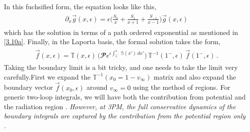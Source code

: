 In this fuchsified form, the equation looks like this,
\begin{align}
    \begin{split}
        \partial_x\vec g(x,\epsilon)=\epsilon \Bigg(\frac{S_0}{x}+\frac{S_1}{x+1}+\frac{S_{-1}}{x-1}\Bigg)\vec g(x,\epsilon)\label{3.15}
    \end{split}
\end{align}
which has the solution in terms of a path ordered exponential as mentioned in \eqref{3.10a}. Finally, in  the Laporta basis, the formal solution takes the form,
\begin{align}
    \begin{split}
        \vec f(x,\epsilon)=\mathbb{T}(x,\epsilon)\,\Bigg(\mathbfcal{P}e^{\epsilon\int_{1^{-}}^x \,\mathbb{S}(x')\,dx'}\Bigg)\,\mathbb{T}^{-1}(1^{-},\epsilon) \,\vec f(1^{-},\epsilon)\,.\label{3.16}
    \end{split}
\end{align}
Taking the boundary limit is a bit tricky, and one needs to take the limit very carefully.First we expand the $\mathbb T^{-1}(x_0=1-v_{\infty})$ matrix  and  also expand the boundary vector $\vec f(x_0,\epsilon)$ around $v_\infty=0$ using the method of regions. For generic two-loop integrals, we will have both the contribution from potential and the radiation region \cite{Dlapa:2023hsl}. \textit{ However, at 3PM, the full conservative dynamics of the boundary integrals are captured by the contribution from the potential region only \cite{Dlapa:2023hsl}.}\\

